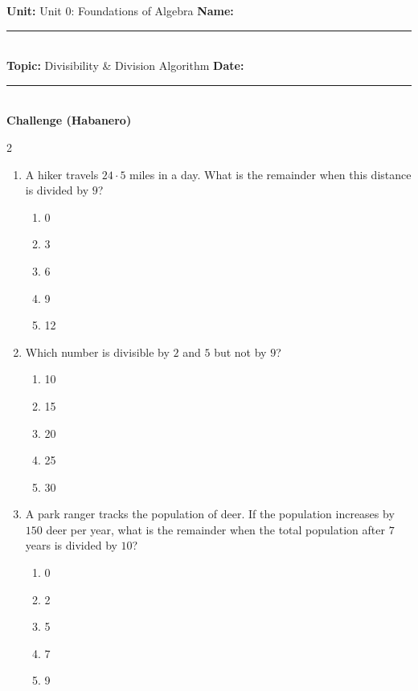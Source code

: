 \documentclass[10pt]{article}
\begin{document}
\enlargethispage{2.5cm}

\begin{tcolorbox}[colback=mainblue!5, colframe=mainblue, sharp corners, boxrule=0.5pt]
    \small \textbf{Unit:} Unit 0: Foundations of Algebra \hfill \textbf{Name:} \rule{3cm}{0.4pt} \\
    \small \textbf{Topic:} Divisibility & Division Algorithm \hfill \textbf{Date:} \rule{2cm}{0.4pt} \\
    \centering \textbf{\large Challenge (Habanero)}
\end{tcolorbox}

\vspace{0.2cm}

\begin{multicols}{2}
\begin{enumerate}[label=\textbf{Q\arabic*.}, leftmargin=*, itemsep=6pt, parsep=0pt]

  \item \small A hiker travels $24 \cdot 5$ miles in a day. What is the remainder when this distance is divided by $9$?
  \begin{enumerate}[label=(\Alph*), leftmargin=0.6cm, nosep, itemsep=2pt]
    \item 0
    \item 3
    \item 6
    \item 9
    \item 12
  \end{enumerate}

  \item \small Which number is divisible by $2$ and $5$ but not by $9$?
  \begin{enumerate}[label=(\Alph*), leftmargin=0.6cm, nosep, itemsep=2pt]
    \item 10
    \item 15
    \item 20
    \item 25
    \item 30
  \end{enumerate}

  \item \small A park ranger tracks the population of deer. If the population increases by $150$ deer per year, what is the remainder when the total population after $7$ years is divided by $10$?
  \begin{enumerate}[label=(\Alph*), leftmargin=0.6cm, nosep, itemsep=2pt]
    \item 0
    \item 2
    \item 5
    \item 7
    \item 9
  \end{enumerate}


\end{enumerate}
\end{multicols}
\end{document}
